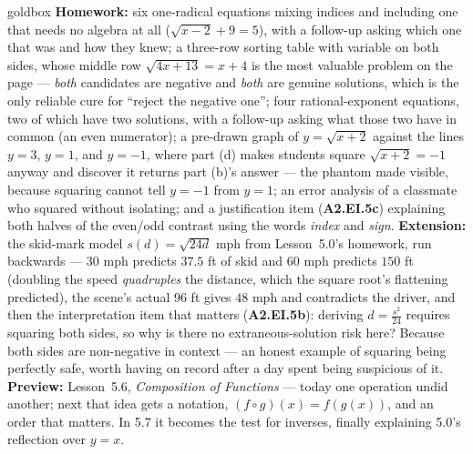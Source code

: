 \documentclass[10pt]{article}
\begin{document}
\begin{skillbox}{goldbox}
\textbf{Homework:} six one-radical equations mixing indices and including one that needs no algebra
at all ($\sqrt{x-2}+9=5$), with a follow-up asking which one that was and how they knew; a
three-row sorting table with variable on both sides, whose middle row $\sqrt{4x+13}=x+4$ is the most
valuable problem on the page --- \emph{both} candidates are negative and \emph{both} are genuine
solutions, which is the only reliable cure for ``reject the negative one''; four rational-exponent
equations, two of which have two solutions, with a follow-up asking what those two have in common
(an even numerator); a pre-drawn graph of $y=\sqrt{x+2}$ against the lines $y=3$, $y=1$, and $y=-1$,
where part (d) makes students square $\sqrt{x+2}=-1$ anyway and discover it returns part (b)'s
answer --- the phantom made visible, because squaring cannot tell $y=-1$ from $y=1$; an error
analysis of a classmate who squared without isolating; and a justification item (\textbf{A2.EI.5c})
explaining both halves of the even/odd contrast using the words \emph{index} and \emph{sign}.
\textbf{Extension:} the skid-mark model $s(d)=\sqrt{24d}$ mph from Lesson~5.0's homework, run
backwards --- $30$ mph predicts $37.5$ ft of skid and $60$ mph predicts $150$ ft (doubling the speed
\emph{quadruples} the distance, which the square root's flattening predicted), the scene's actual
$96$ ft gives $48$ mph and contradicts the driver, and then the interpretation item that matters
(\textbf{A2.EI.5b}): deriving $d=\frac{s^{2}}{24}$ requires squaring both sides, so why is there no
extraneous-solution risk here? Because both sides are non-negative in context --- an honest example
of squaring being perfectly safe, worth having on record after a day spent being suspicious of it.
\textbf{Preview:} Lesson~5.6, \emph{Composition of Functions} --- today one operation undid another;
next that idea gets a notation, $(f\circ g)(x)=f(g(x))$, and an order that matters. In 5.7 it
becomes the test for inverses, finally explaining 5.0's reflection over $y=x$.
\end{skillbox}
\end{document}
